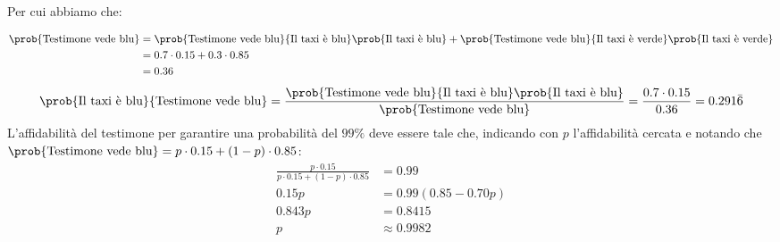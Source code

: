\documentclass[\main/main.tex]{subfiles}
\begin{document}
Per cui abbiamo che:

\begin{align*}
  \prob{\text{Testimone vede blu}} & = \prob{\text{Testimone vede blu}}{\text{Il taxi è blu}}\prob{{\text{Il taxi è blu}}} +  \prob{\text{Testimone vede blu}}{\text{Il taxi è verde}}\prob{{\text{Il taxi è verde}}} \\
                                   & = 0.7\cdot0.15+0.3\cdot0.85                                                                                                                                                      \\
                                   & = 0.36
\end{align*}
\begin{align*}
  \prob{\text{Il taxi è blu}}{\text{Testimone vede blu}} = \frac{\prob{\text{Testimone vede blu}}{\text{Il taxi è blu}}\prob{{\text{Il taxi è blu}}}}{\prob{\text{Testimone vede blu}}} = \frac{0.7\cdot 0.15}{0.36} = 0.291\bar{6}
\end{align*}
L'affidabilità del testimone per garantire una probabilità del $99\%$ deve essere tale che, indicando con $p$ l'affidabilità cercata e notando che $\prob{\text{Testimone vede blu}} = p \cdot 0.15 + (1-p) \cdot 0.85$:
\begin{align*}
  \frac{p \cdot 0.15}{p \cdot 0.15 + (1-p) \cdot 0.85} &= 0.99 \\
  0.15p &= 0.99(0.85 - 0.70p) \\
  0.843p &= 0.8415 \\
  p &\approx 0.9982
\end{align*}
\end{document}
